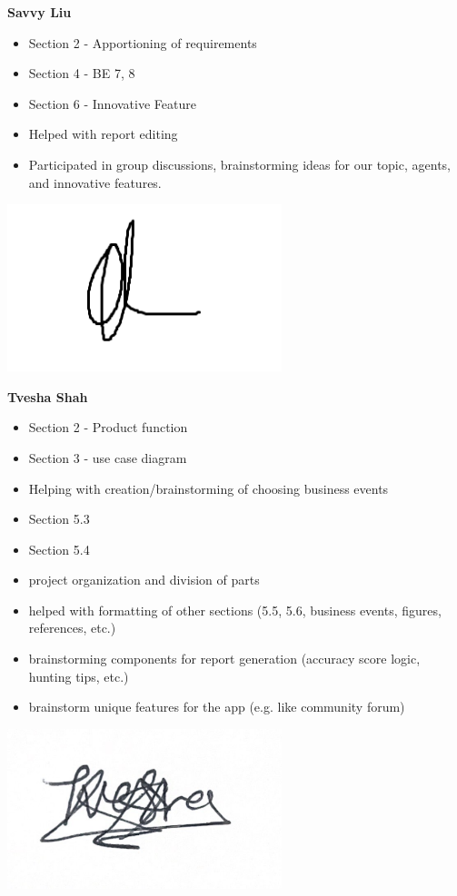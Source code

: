 \documentclass[]{article}
\begin{document}
\textbf{Savvy Liu}
\begin{itemize}
\setlength\itemindent{2em}
\item Section 2 - Apportioning of requirements 
\item Section 4 - BE 7, 8 
\item Section 6 - Innovative Feature 
\item Helped with report editing 
\item Participated in group discussions, brainstorming ideas for our topic, agents, and innovative features. 
\end{itemize} 
\includegraphics[width=0.6\textwidth]{Savvy.png}

\textbf{Tvesha Shah}
\begin{itemize}
    \setlength\itemindent{2em}
    \item Section 2 - Product function
    \item Section 3 - use case diagram 
    \item Helping with creation/brainstorming of choosing business events 
    \item Section 5.3 
    \item Section 5.4 
    \item project organization and division of parts 
    \item helped with formatting of other sections (5.5, 5.6, business events, figures, references, etc.)
    \item brainstorming components for report generation (accuracy score logic, hunting tips, etc.)
    \item brainstorm unique features for the app (e.g. like community forum)
\end{itemize}
\includegraphics[width=0.6\textwidth]{Tvesha.png}
\end{document}
